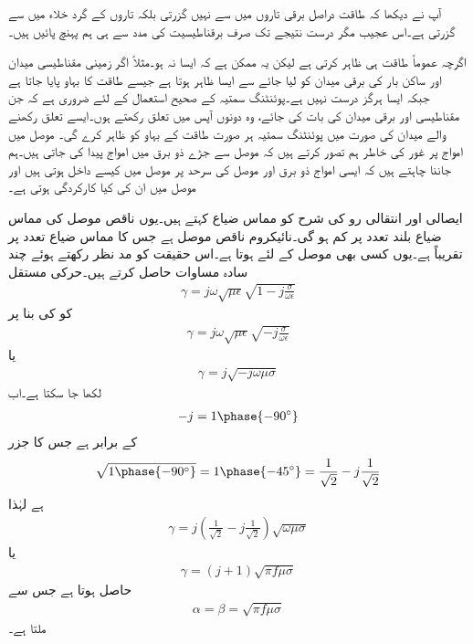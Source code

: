 آپ نے دیکھا کہ طاقت دراصل برقی تاروں میں سے نہیں گزرتی بلکہ تاروں کے گرد خلاء میں سے گزرتی ہے۔اس عجیب مگر درست نتیجے تک صرف برقناطیسیت کی مدد سے ہی ہم پہنچ پائیں ہیں۔ 

اگرچہ  عموماً طاقت ہی ظاہر کرتی ہے لیکن یہ ممکن ہے کہ ایسا نہ ہو۔مثلاً اگر زمینی مقناطیسی میدان  اور ساکن بار کی برقی میدان  کو لیا جائے  سے ایسا ظاہر ہوتا ہے جیسے طاقت کا بہاو پایا جاتا ہے جبکہ ایسا ہرگز درست نہیں ہے۔پوئنٹنگ سمتیہ کے صحیح استعمال کے لئے ضروری ہے کہ جن مقناطیسی اور برقی میدان کی بات کی جائے، وہ دونوں آپس میں تعلق رکھتے ہوں۔ایسے تعلق رکھنے والے میدان کی صورت میں پوئنٹنگ  سمتیہ ہر صورت طاقت کے بہاو کو ظاہر کرے گی۔ 
موصل میں امواج پر غور کی خاطر ہم تصور کرتے ہیں کہ موصل سے جڑے ذو برق میں امواج پیدا کی جاتی ہیں۔ہم جاننا چاہتے ہیں کہ ایسی امواج ذو برق اور موصل کی سرحد پر موصل میں کیسے داخل ہوتی ہیں اور موصل میں ان کی کیا کارکردگی ہوتی ہے۔

ایصالی اور انتقالی رو کی شرح  کو مماس ضیاع کہتے ہیں۔یوں ناقص موصل کی مماس ضیاع بلند تعدد پر کم ہو گی۔نائیکروم ناقص موصل ہے جس کا مماس ضیاع  تعدد پر  تقریباً  ہے۔یوں کسی بھی موصل کے لئے  ہوتا ہے۔اس حقیقت کو مد نظر رکھتے ہوئے چند سادہ مساوات حاصل کرتے ہیں۔حرکی مستقل
\begin{align*}
\gamma=j \omega \sqrt{\mu \epsilon} \sqrt{1-j \frac{\sigma}{\omega \epsilon}}
\end{align*}
کو  کی بنا پر
\begin{align*}
\gamma=j \omega \sqrt{\mu \epsilon}\sqrt{-j \frac{\sigma}{\omega \epsilon}}
\end{align*}
یا
\begin{align*}
\gamma=j \sqrt{-j \omega \mu \sigma}
\end{align*}
لکھا جا سکتا ہے۔اب
\begin{align*}
-j = 1\phase{-90^\circ}
\end{align*}
کے برابر ہے جس کا جزر
\begin{align*}
\sqrt{1\phase{-90^\circ}}=1\phase{-45^\circ}=\frac{1}{\sqrt{2}}-j \frac{1}{\sqrt{2}}
\end{align*}
ہے لہٰذا
\begin{align*}
\gamma=j \left(\frac{1}{\sqrt{2}}-j \frac{1}{\sqrt{2}}\right)\sqrt{\omega \mu \sigma}
\end{align*}
یا
\begin{align}
\gamma=\left(j+1 \right)\sqrt{\pi f \mu \sigma}
\end{align}
حاصل ہوتا ہے جس سے
\begin{align}
\alpha=\beta=\sqrt{\pi f \mu \sigma}
\end{align}
ملتا ہے۔

